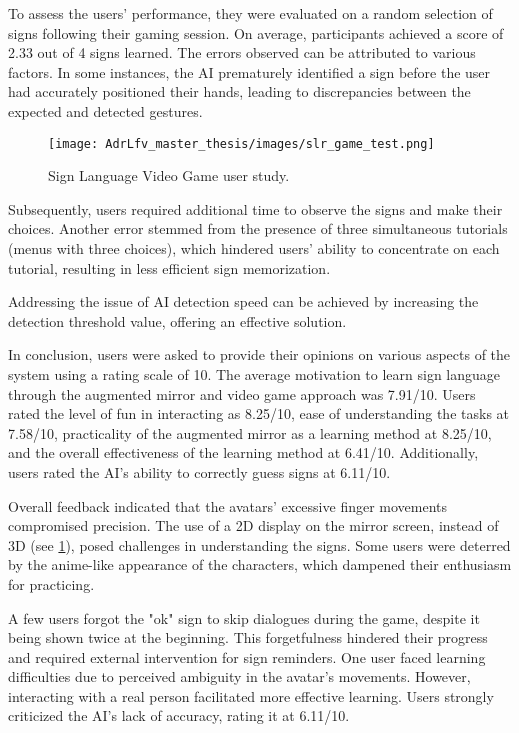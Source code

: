 To assess the users' performance, they were evaluated on a random selection of signs following their gaming session. On average, participants achieved a score of 2.33 out of 4 signs learned. The errors observed can be attributed to various factors. In some instances, the AI prematurely identified a sign before the user had accurately positioned their hands, leading to discrepancies between the expected and detected gestures.

\begin{figure}[h]
    \centering
    \texttt{[image: AdrLfv\_master\_thesis/images/slr\_game\_test.png]}
    \caption{Sign Language Video Game user study.}
    \label{fig:slr_game_test}
\end{figure}

Subsequently, users required additional time to observe the signs and make their choices. Another error stemmed from the presence of three simultaneous tutorials (menus with three choices), which hindered users' ability to concentrate on each tutorial, resulting in less efficient sign memorization.

Addressing the issue of AI detection speed can be achieved by increasing the detection threshold value, offering an effective solution.

In conclusion, users were asked to provide their opinions on various aspects of the system using a rating scale of 10. The average motivation to learn sign language through the augmented mirror and video game approach was 7.91/10. Users rated the level of fun in interacting as 8.25/10, ease of understanding the tasks at 7.58/10, practicality of the augmented mirror as a learning method at 8.25/10, and the overall effectiveness of the learning method at 6.41/10. Additionally, users rated the AI's ability to correctly guess signs at 6.11/10.

Overall feedback indicated that the avatars' excessive finger movements compromised precision. The use of a 2D display on the mirror screen, instead of 3D (see \ref{fig:slr_game_test}), posed challenges in understanding the signs. Some users were deterred by the anime-like appearance of the characters, which dampened their enthusiasm for practicing.

A few users forgot the "ok" sign to skip dialogues during the game, despite it being shown twice at the beginning. This forgetfulness hindered their progress and required external intervention for sign reminders. One user faced learning difficulties due to perceived ambiguity in the avatar's movements. However, interacting with a real person facilitated more effective learning. Users strongly criticized the AI's lack of accuracy, rating it at 6.11/10.

